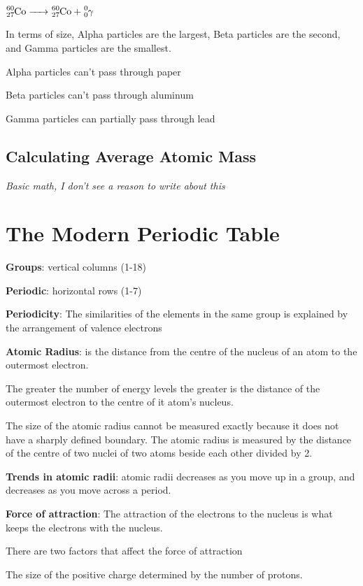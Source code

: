 \documentclass[12pt]{article}
\begin{document}
$\ce{^{60}_{27}Co -> ^{60}_{27}Co + ^0_0\gamma}$

In terms of size, Alpha particles are the largest, Beta particles are the second, and Gamma particles are the smallest.

Alpha particles can't pass through paper

Beta particles can't pass through aluminum

Gamma particles can partially pass through lead

\subsection{Calculating Average Atomic Mass}

\textit{Basic math, I don't see a reason to write about this}

\section{The Modern Periodic Table}

\textbf{Groups}: vertical columns (1-18)

\noindent\textbf{Periodic}: horizontal rows (1-7)

\noindent\textbf{Periodicity}: The similarities of the elements in the same group is explained by the arrangement of valence electrons

\noindent\textbf{Atomic Radius}: is the distance from the centre of the nucleus of an atom to the outermost electron.

The greater the number of energy levels the greater is the distance of the outermost electron to the centre of it atom's nucleus.

\medskip

The size of the atomic radius cannot be measured exactly because it does not have a sharply defined boundary. The atomic radius is measured by the distance of the centre of two nuclei of two atoms beside each other divided by 2.

\noindent\textbf{Trends in atomic radii}: atomic radii decreases as you move up in a group, and decreases as you move across a period.

\medskip

\noindent\textbf{Force of attraction}: The attraction of the electrons to the nucleus is what keeps the electrons with the nucleus.

\noindent There are two factors that affect the force of attraction

\medskip
The size of the positive charge determined by the number of protons.
\end{document}
